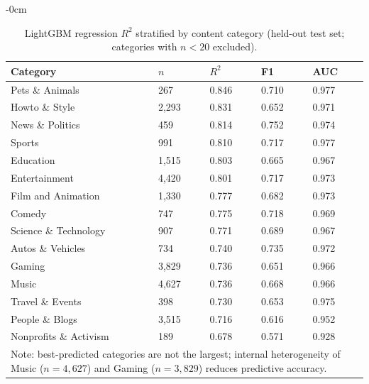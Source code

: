 \documentclass[journal,article,submit,pdftex,moreauthors]{Definitions/mdpi}
\begin{document}
\begin{adjustwidth}{-\extralength}{0cm}
\begin{table}[H]
\caption{LightGBM regression $R^2$ stratified by content category
(held-out test set; categories with $n < 20$ excluded).\label{tab:category}}
\begin{tabularx}{\textwidth}{lllll}
\toprule
\textbf{Category}&\textbf{$n$}&\textbf{$R^2$}&
\textbf{F1}&\textbf{AUC}\\
\midrule
Pets \& Animals         &   267 & 0.846 & 0.710 & 0.977 \\
Howto \& Style          & 2,293 & 0.831 & 0.652 & 0.971 \\
News \& Politics        &   459 & 0.814 & 0.752 & 0.974 \\
Sports                  &   991 & 0.810 & 0.717 & 0.977 \\
Education               & 1,515 & 0.803 & 0.665 & 0.967 \\
Entertainment           & 4,420 & 0.801 & 0.717 & 0.973 \\
Film and Animation      & 1,330 & 0.777 & 0.682 & 0.973 \\
Comedy                  &   747 & 0.775 & 0.718 & 0.969 \\
Science \& Technology   &   907 & 0.771 & 0.689 & 0.967 \\
Autos \& Vehicles       &   734 & 0.740 & 0.735 & 0.972 \\
Gaming                  & 3,829 & 0.736 & 0.651 & 0.966 \\
Music                   & 4,627 & 0.736 & 0.668 & 0.966 \\
Travel \& Events        &   398 & 0.730 & 0.653 & 0.975 \\
People \& Blogs         & 3,515 & 0.716 & 0.616 & 0.952 \\
Nonprofits \& Activism  &   189 & 0.678 & 0.571 & 0.928 \\
\bottomrule
\multicolumn{5}{l}{\footnotesize Note: best-predicted categories are
not the largest; internal heterogeneity of Music ($n = 4{,}627$) and
Gaming ($n = 3{,}829$) reduces predictive accuracy.}
\end{tabularx}
\end{table}


\end{adjustwidth}
\end{document}
